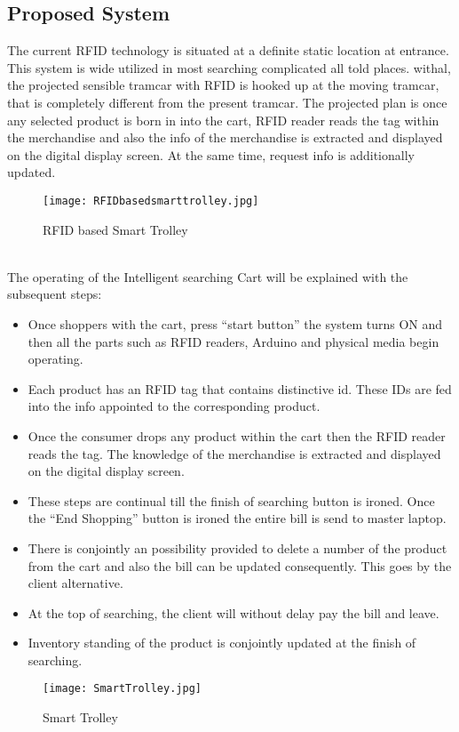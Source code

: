 \documentclass[12pt]{article}
\begin{document}
\subsection{Proposed System}
\hspace*{1 cm}The current RFID technology is situated at a definite static location at entrance.  This system is wide utilized in most searching complicated all told places. withal, the projected sensible tramcar with RFID is hooked up at the moving tramcar, that is completely different from the present tramcar.   The projected plan is once any selected product is born in into the cart, RFID reader reads the tag within the merchandise and also the info of the merchandise is extracted and displayed on the digital display screen. At the same time, request info is additionally updated. \\
\begin{figure}[h]
\texttt{[image: RFIDbasedsmarttrolley.jpg]}
\centering
\caption{RFID based Smart Trolley}
\end{figure}\\
\hspace*{1 cm}The operating of the Intelligent searching Cart will be explained with the subsequent steps: 
\begin{itemize}
\item Once shoppers with the cart, press “start button” the system turns ON and then all the parts such as RFID readers, Arduino and physical media begin operating.
\item Each product has an RFID tag that contains distinctive id. These IDs are fed into the info appointed to the corresponding product.  
\item Once the consumer drops any product within the cart then the RFID reader reads the tag. The knowledge of the merchandise is extracted and displayed on the digital display screen.
\item These steps are continual till the finish of searching button is ironed. Once the “End Shopping” button is ironed the entire bill is send to master laptop.
\item There is conjointly an possibility provided to delete a number of the product from the cart and also the bill can be updated consequently. This goes by the client alternative.
\item At the top of searching, the client will without delay pay the bill and leave.
\item Inventory standing of the product is conjointly updated at the finish of searching.
\end{itemize}
\begin{figure}[h]
\texttt{[image: SmartTrolley.jpg]}
\centering
\caption{Smart Trolley}
\end{figure}
\end{document}
